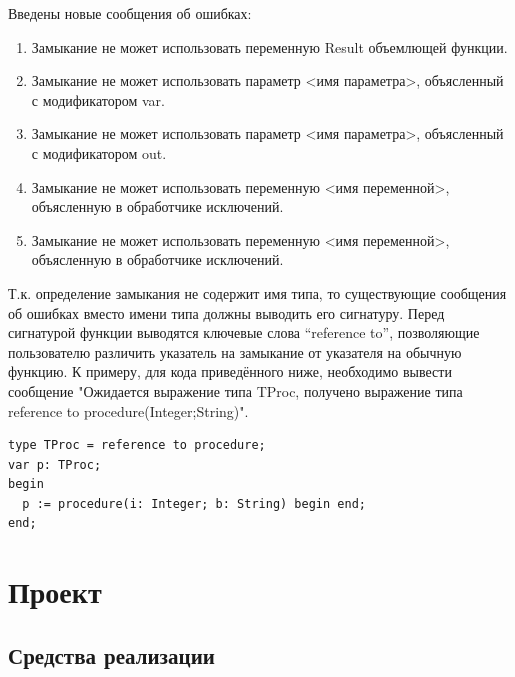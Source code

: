 \documentclass{imcs}
\begin{document}
Введены новые сообщения об ошибках:

\begin{enumerate}
  \item Замыкание не может использовать переменную Result объемлющей функции.
  \item Замыкание не может использовать параметр <имя параметра>, объясленный с модификатором var.
  \item Замыкание не может использовать параметр <имя параметра>, объясленный с модификатором out.
  \item Замыкание не может использовать переменную <имя переменной>, объясленную в обработчике исключений.
  \item Замыкание не может использовать переменную <имя переменной>, объясленную в обработчике исключений.    
\end{enumerate}

Т.к. определение замыкания не содержит имя типа, то существующие сообщения об ошибках вместо имени типа
должны выводить его сигнатуру. Перед сигнатурой функции выводятся ключевые слова ``reference to'', позволяющие
пользователю различить указатель на замыкание от указателя на обычную функцию. К примеру, для кода
приведённого ниже, необходимо вывести сообщение
"Ожидается выражение типа TProc, получено выражение типа reference to procedure(Integer;String)".

\begin{lstlisting}
type TProc = reference to procedure;
var p: TProc;
begin
  p := procedure(i: Integer; b: String) begin end;
end;
\end{lstlisting}

\section{Проект}

\iffalse

\subsection{Средства реализации}
\end{document}
